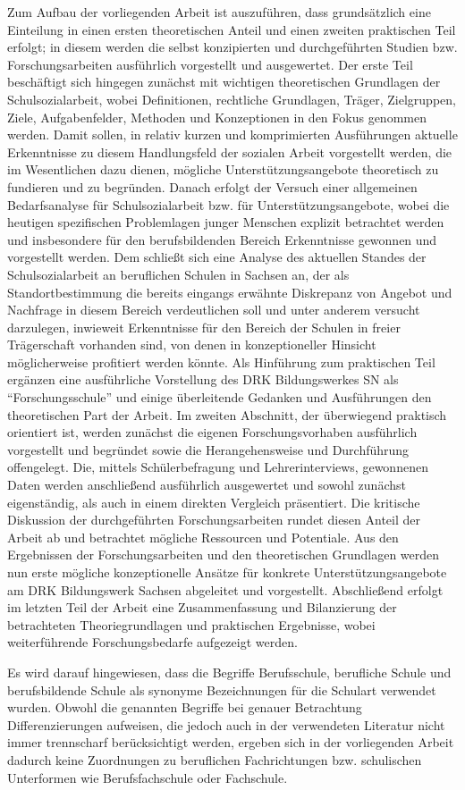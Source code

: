 Zum Aufbau der vorliegenden Arbeit ist auszuführen, dass grundsätzlich eine Einteilung in einen ersten theoretischen Anteil und einen zweiten praktischen Teil erfolgt; in diesem werden die selbst konzipierten und durchgeführten Studien bzw. Forschungsarbeiten ausführlich vorgestellt und ausgewertet. Der erste Teil beschäftigt sich hingegen zunächst mit wichtigen theoretischen Grundlagen der Schulsozialarbeit, wobei Definitionen, rechtliche Grundlagen, Träger, Zielgruppen, Ziele, Aufgabenfelder, Methoden und Konzeptionen in den Fokus genommen werden. Damit sollen, in relativ kurzen und komprimierten Ausführungen aktuelle Erkenntnisse zu diesem Handlungsfeld der sozialen Arbeit vorgestellt werden, die im Wesentlichen dazu dienen, mögliche Unterstützungsangebote theoretisch zu fundieren und zu begründen. Danach erfolgt der Versuch einer allgemeinen Bedarfsanalyse für Schulsozialarbeit bzw. für Unterstützungsangebote, wobei die heutigen spezifischen Problemlagen junger Menschen explizit betrachtet werden und insbesondere für den berufsbildenden Bereich Erkenntnisse gewonnen und vorgestellt werden. Dem schließt sich eine Analyse des aktuellen Standes der Schulsozialarbeit an beruflichen Schulen in Sachsen an, der als Standortbestimmung die bereits eingangs erwähnte Diskrepanz von Angebot und Nachfrage in diesem Bereich verdeutlichen soll und unter anderem versucht darzulegen, inwieweit Erkenntnisse für den Bereich der Schulen in freier Trägerschaft vorhanden sind, von denen in konzeptioneller Hinsicht möglicherweise profitiert werden könnte. Als Hinführung zum praktischen Teil ergänzen eine ausführliche Vorstellung des DRK Bildungswerkes SN als "`Forschungsschule"' und einige überleitende Gedanken und Ausführungen den theoretischen Part der Arbeit. Im zweiten Abschnitt, der überwiegend praktisch orientiert ist, werden zunächst die eigenen Forschungsvorhaben ausführlich vorgestellt und begründet sowie die Herangehensweise und Durchführung offengelegt. Die, mittels Schülerbefragung und Lehrerinterviews, gewonnenen Daten werden anschließend ausführlich ausgewertet und sowohl zunächst eigenständig, als auch in einem direkten Vergleich präsentiert. Die kritische Diskussion der durchgeführten Forschungsarbeiten rundet diesen Anteil der Arbeit ab und betrachtet mögliche Ressourcen und Potentiale. Aus den Ergebnissen der Forschungsarbeiten und den theoretischen Grundlagen werden nun erste mögliche konzeptionelle Ansätze für konkrete Unterstützungsangebote am DRK Bildungswerk Sachsen abgeleitet und vorgestellt. Abschließend erfolgt im letzten Teil der Arbeit eine Zusammenfassung und Bilanzierung der betrachteten Theoriegrundlagen und praktischen Ergebnisse, wobei weiterführende Forschungsbedarfe aufgezeigt werden. 

Es wird darauf hingewiesen, dass die Begriffe Berufsschule, berufliche Schule und berufsbildende Schule als synonyme Bezeichnungen für die Schulart verwendet wurden. Obwohl die genannten Begriffe bei genauer Betrachtung Differenzierungen aufweisen, die jedoch auch in der verwendeten Literatur nicht immer trennscharf berücksichtigt werden, ergeben sich in der vorliegenden Arbeit dadurch keine Zuordnungen zu beruflichen Fachrichtungen bzw. schulischen Unterformen wie Berufsfachschule oder Fachschule.
